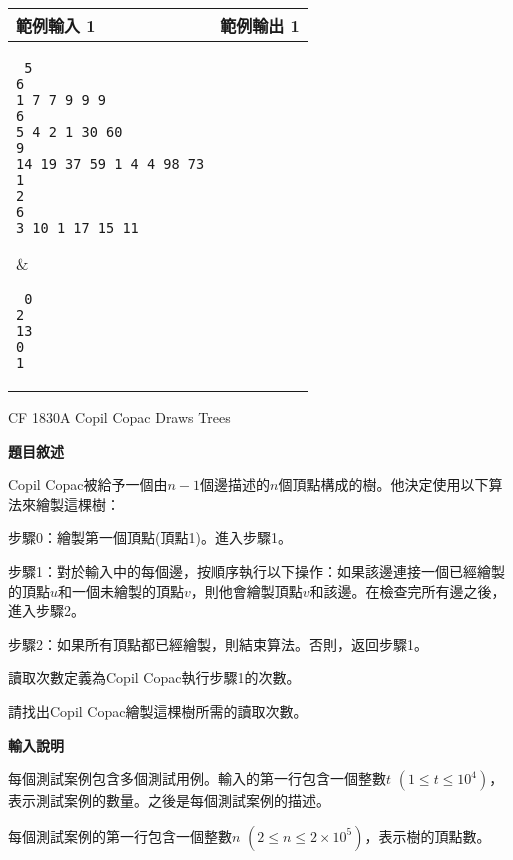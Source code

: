     \begin{tabular}{|m{7cm}|m{7cm}|}
        \hline
        範例輸入 1 & 範例輸出 1 \\
        \hline
        \parbox[t]{7cm} %
        { \tt
        5 \\
        6 \\
        1 7 7 9 9 9 \\
        6 \\
        5 4 2 1 30 60 \\
        9 \\
        14 19 37 59 1 4 4 98 73 \\
        1 \\
        2 \\ 
        6 \\
        3 10 1 17 15 11        \\
        } &
        \parbox[t]{7cm}
        { \tt
        0 \\
        2 \\
        13 \\ 
        0 \\
        1 \\        
        } \\
        \hline
    \end{tabular}

    \problem CF 1830A Copil Copac Draws Trees

    \textbf{題目敘述}

    Copil Copac被給予一個由$n-1$個邊描述的$n$個頂點構成的樹。他決定使用以下算法來繪製這棵樹：

    步驟0：繪製第一個頂點(頂點1)。進入步驟1。
    
    步驟1：對於輸入中的每個邊，按順序執行以下操作：如果該邊連接一個已經繪製的頂點$u$和一個未繪製的頂點$v$，則他會繪製頂點$v$和該邊。在檢查完所有邊之後，進入步驟2。
    
    步驟2：如果所有頂點都已經繪製，則結束算法。否則，返回步驟1。
    
    讀取次數定義為Copil Copac執行步驟1的次數。

    請找出Copil Copac繪製這棵樹所需的讀取次數。

    \textbf{輸入說明}

    每個測試案例包含多個測試用例。輸入的第一行包含一個整數$t$ $(1\le t\le 10^4)$，表示測試案例的數量。之後是每個測試案例的描述。

    每個測試案例的第一行包含一個整數$n$ $(2\le n\le 2\times 10^5)$，表示樹的頂點數。

